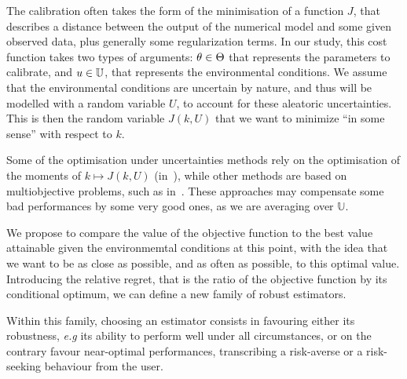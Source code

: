 \documentclass[../../Main_ManuscritThese.tex]{subfiles}
\begin{document}
  The calibration often takes the form of the minimisation of a
function $J$, that describes a distance between the output of the
numerical model and some given observed data, plus generally some
regularization terms.  In our study, this cost function takes two
types of arguments: $\theta\in\Theta$ that represents the parameters to
calibrate, and $u\in\mathbb{U}$, that represents the environmental
conditions.  We assume that the environmental conditions are uncertain
by nature, and thus will be modelled with a random variable $U$, to
account for these aleatoric uncertainties.  This is then the random
variable $J(k,U)$ that we want to minimize ``in some sense'' with
respect to $k$.

  Some of the optimisation under uncertainties methods rely on the
optimisation of the moments of $ k\mapsto J(k,U)$
(in~\cite{lehman_designing_2004,janusevskis_simultaneous_2010}), while
other methods are based on multiobjective problems, such as
in~\cite{baudoui_optimisation_2012,ribaud_krigeage_2018}.  These
approaches may compensate some bad performances by some very good
ones, as we are averaging over $\mathbb{U}$.

  
  We propose to compare the value of the objective function to the
best value attainable given the environmemtal conditions at this
point, with the idea that we want to be as close as possible, and as
often as possible, to this optimal value. Introducing the relative
regret, that is the ratio of the objective function by its conditional
optimum, we can define a new family of robust estimators.

  Within this family, choosing an estimator consists in favouring
either its robustness, \emph{e.g} its ability to perform well under
all circumstances, or on the contrary favour near-optimal
performances, transcribing a risk-averse or a risk-seeking behaviour
from the user.
 


\subfileLocal{
	\pagestyle{empty}
	
	
}
\end{document}
